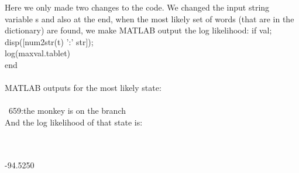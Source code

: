\documentclass[11pt,a4paper,oneside]{report}
\begin{document}
Here we only made two changes to the code. We changed the input string variable s and also at the end, when the most likely set of words (that are in the dictionary) are found, we make MATLAB output the log likelihood:
    if val; \\
        disp([num2str(t) ':' str]);\\
        log(maxval.table{t}) \\
    end\\\\
    
    MATLAB outputs for the most likely state:\\\\\
    659:the monkey is on the branch\\

And the log likelihood of that state is:\\\\\

  -94.5250
\end{document}
